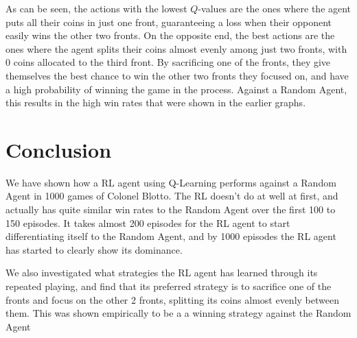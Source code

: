 \documentclass[11pt, oneside]{article}   	%
\begin{document}
\hfill

As can be seen, the actions with the lowest $Q$-values are the ones where the agent puts all their coins in just one front, guaranteeing a loss when their opponent easily wins the other two fronts. On the opposite end, the best actions are the ones where the agent splits their coins almost evenly among just two fronts, with 0 coins allocated to the third front. By sacrificing one of the fronts, they give themselves the best chance to win the other two fronts they focused on, and have a high probability of winning the game in the process. Against a Random Agent, this results in the high win rates that were shown in the earlier graphs.

\section{Conclusion}

We have shown how a RL agent using Q-Learning performs against a Random Agent in 1000 games of Colonel Blotto. The RL doesn't do at well at first, and actually has quite similar win rates to the Random Agent over the first 100 to 150 episodes. It takes almost 200 episodes for the RL agent to start differentiating itself to the Random Agent, and by 1000 episodes the RL agent has started to clearly show its dominance.

\hfill

We also investigated what strategies the RL agent has learned through its repeated playing, and find that its preferred strategy is to sacrifice one of the fronts and focus on the other 2 fronts, splitting its coins almost evenly between them. This was shown empirically to be a a winning strategy against the Random Agent

\nocite{*}


\end{document}
